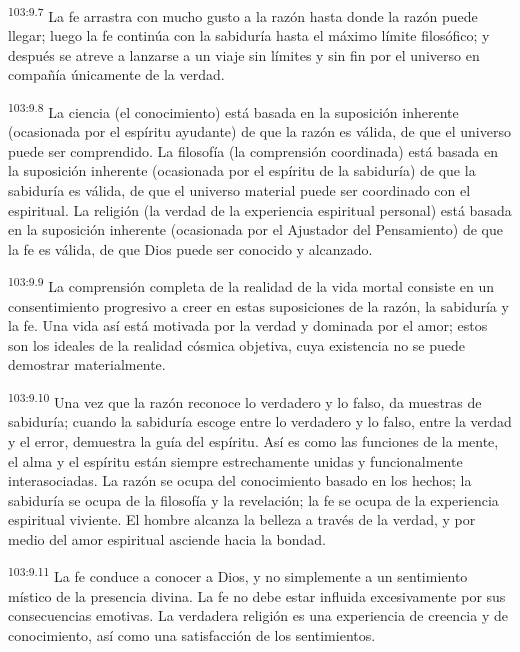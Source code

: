 \documentclass[twoside, 11pt]{book}
\begin{document}
\par
\textsuperscript{103:9.7} La fe arrastra con mucho gusto a la razón hasta donde la razón puede llegar; luego la fe continúa con la sabiduría hasta el máximo límite filosófico; y después se atreve a lanzarse a un viaje sin límites y sin fin por el universo en compañía únicamente de la verdad.

\par
\textsuperscript{103:9.8} La ciencia (el conocimiento) está basada en la suposición inherente (ocasionada por el espíritu ayudante) de que la razón es válida, de que el universo puede ser comprendido. La filosofía (la comprensión coordinada) está basada en la suposición inherente (ocasionada por el espíritu de la sabiduría) de que la sabiduría es válida, de que el universo material puede ser coordinado con el espiritual. La religión (la verdad de la experiencia espiritual personal) está basada en la suposición inherente (ocasionada por el Ajustador del Pensamiento) de que la fe es válida, de que Dios puede ser conocido y alcanzado.

\par
\textsuperscript{103:9.9} La comprensión completa de la realidad de la vida mortal consiste en un consentimiento progresivo a creer en estas suposiciones de la razón, la sabiduría y la fe. Una vida así está motivada por la verdad y dominada por el amor; estos son los ideales de la realidad cósmica objetiva, cuya existencia no se puede demostrar materialmente.

\par
\textsuperscript{103:9.10} Una vez que la razón reconoce lo verdadero y lo falso, da muestras de sabiduría; cuando la sabiduría escoge entre lo verdadero y lo falso, entre la verdad y el error, demuestra la guía del espíritu. Así es como las funciones de la mente, el alma y el espíritu están siempre estrechamente unidas y funcionalmente interasociadas. La razón se ocupa del conocimiento basado en los hechos; la sabiduría se ocupa de la filosofía y la revelación; la fe se ocupa de la experiencia espiritual viviente. El hombre alcanza la belleza a través de la verdad, y por medio del amor espiritual asciende hacia la bondad.

\par
\textsuperscript{103:9.11} La fe conduce a conocer a Dios, y no simplemente a un sentimiento místico de la presencia divina. La fe no debe estar influida excesivamente por sus consecuencias emotivas. La verdadera religión es una experiencia de creencia y de conocimiento, así como una satisfacción de los sentimientos.
\end{document}
